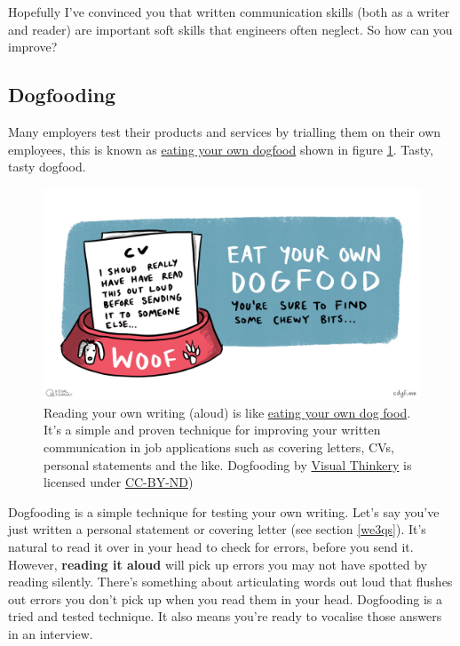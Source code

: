 \documentclass[
]{book}
\begin{document}
Hopefully I've convinced you that written communication skills (both as a writer and reader) are important soft skills that engineers often neglect. So how can you improve?

\hypertarget{dogfooding}{%
\subsection{Dogfooding}\label{dogfooding}}

Many employers test their products and services by trialling them on their own employees, this is known as \href{https://en.wikipedia.org/wiki/Eating_your_own_dog_food}{eating your own dogfood} shown in figure \ref{fig:dogfooding-fig}. Tasty, tasty dogfood. 🐶

\begin{figure}

{\centering \includegraphics[width=1\linewidth]{images/Dogfooding} 

}

\caption{Reading your own writing (aloud) is like \href{https://en.wikipedia.org/wiki/Eating_your_own_dog_food}{eating your own dog food}. It's a simple and proven technique for improving your written communication in job applications such as covering letters, CVs, personal statements and the like. Dogfooding by \href{https://visualthinkery.com/}{Visual Thinkery} is licensed under \href{https://creativecommons.org/licenses/by-nd/4.0/}{CC-BY-ND})}\label{fig:dogfooding-fig}
\end{figure}



Dogfooding is a simple technique for testing your own writing. Let's say you've just written a personal statement or covering letter (see section \ref{we3qs}). It's natural to read it over in your head to check for errors, before you send it. However, \textbf{reading it aloud} will pick up errors you may not have spotted by reading silently. There's something about articulating words out loud that flushes out errors you don't pick up when you read them in your head. Dogfooding is a tried and tested technique. It also means you're ready to vocalise those answers in an interview.
\end{document}
